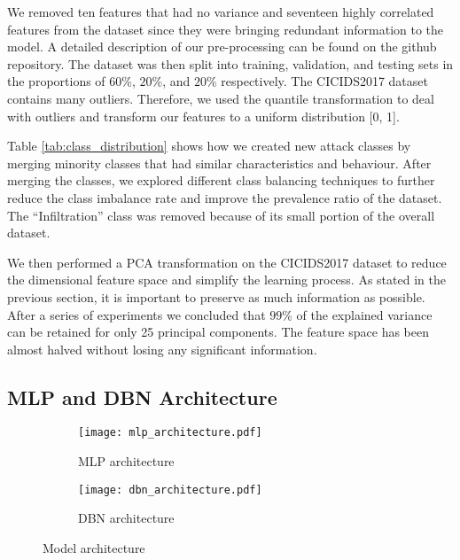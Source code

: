 \documentclass[runningheads]{llncs}
\begin{document}
We removed ten features that had no variance and seventeen highly correlated features from the dataset since they were bringing redundant information to the model. A detailed description of our pre-processing can be found on the github repository\footnotemark[\value{footnote}]. The dataset was then split into training, validation, and testing sets in the proportions of $60$\%, $20$\%, and $20$\% respectively. The CICIDS2017 dataset contains many outliers. Therefore, we used the quantile transformation to deal with outliers and transform our features to a uniform distribution [0, 1].

Table \ref{tab:class_distribution} shows how we created new attack classes by merging minority classes that had similar characteristics and behaviour. After merging the classes, we explored different class balancing techniques to further reduce the class imbalance rate and improve the prevalence ratio of the dataset. The ``Infiltration'' class was removed because of its small portion of the overall dataset.

We then performed a \ac{PCA} transformation on the CICIDS2017 dataset to reduce the dimensional feature space and simplify the learning process. As stated in the previous section, it is important to preserve as much information as possible. After a series of experiments we concluded that $99$\% of the explained variance can be retained for only 25 principal components. The feature space has been almost halved without losing any significant information.

\subsection{\ac{MLP} and \ac{DBN} Architecture}
\label{subsec:model architecture}

\begin{figure}[t]
    \centering
    \begin{subfigure}[b]{0.4\textwidth}
        \centering
        \texttt{[image: mlp\_architecture.pdf]}
        \caption{MLP architecture}
        \label{fig:mlp_architecture}
    \end{subfigure}
    \hfill
    \begin{subfigure}[b]{0.4\textwidth}
        \centering
        \texttt{[image: dbn\_architecture.pdf]}
        \caption{DBN architecture}
        \label{fig:dbn_architecture}
    \end{subfigure}
    \caption{Model architecture}
    \label{fig:model_architecture}
\end{figure}
\end{document}
